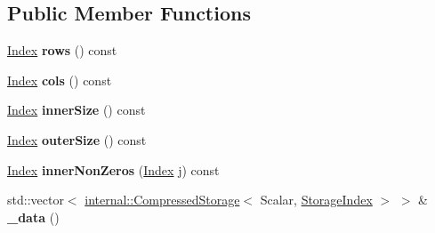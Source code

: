 \subsection*{Public Member Functions}
\begin{DoxyCompactItemize}
\item 
\mbox{\label{class_eigen_1_1_dynamic_sparse_matrix_a1c2ced5ffb36a58e59235d94d521158c}} 
\hyperlink{group___core___module_a554f30542cc2316add4b1ea0a492ff02}{Index} {\bfseries rows} () const
\item 
\mbox{\label{class_eigen_1_1_dynamic_sparse_matrix_abbdaf1aa19849142248b9ca523248ced}} 
\hyperlink{group___core___module_a554f30542cc2316add4b1ea0a492ff02}{Index} {\bfseries cols} () const
\item 
\mbox{\label{class_eigen_1_1_dynamic_sparse_matrix_a03877f41d99fd28f24a3f9bb97695ec2}} 
\hyperlink{group___core___module_a554f30542cc2316add4b1ea0a492ff02}{Index} {\bfseries inner\+Size} () const
\item 
\mbox{\label{class_eigen_1_1_dynamic_sparse_matrix_aa9fdcceaa71e86fb918ddcf47720bd6f}} 
\hyperlink{group___core___module_a554f30542cc2316add4b1ea0a492ff02}{Index} {\bfseries outer\+Size} () const
\item 
\mbox{\label{class_eigen_1_1_dynamic_sparse_matrix_adc595c5b9e177baaa6b1de9da652ce44}} 
\hyperlink{group___core___module_a554f30542cc2316add4b1ea0a492ff02}{Index} {\bfseries inner\+Non\+Zeros} (\hyperlink{group___core___module_a554f30542cc2316add4b1ea0a492ff02}{Index} j) const
\item 
\mbox{\label{class_eigen_1_1_dynamic_sparse_matrix_ae00bcc84c451a5f4c657fbd6cd3b4600}} 
std\+::vector$<$ \hyperlink{class_eigen_1_1internal_1_1_compressed_storage}{internal\+::\+Compressed\+Storage}$<$ Scalar, \hyperlink{group___sparse_core___module_a0b540ba724726ebe953f8c0df06081ed}{Storage\+Index} $>$ $>$ \& {\bfseries \+\_\+data} ()
\item 
\mbox{\label{class_eigen_1_1_dynamic_sparse_matrix_a90a36beec6fa0baaaf56142b3173bd6c}} 

\end{DoxyCompactItemize}
